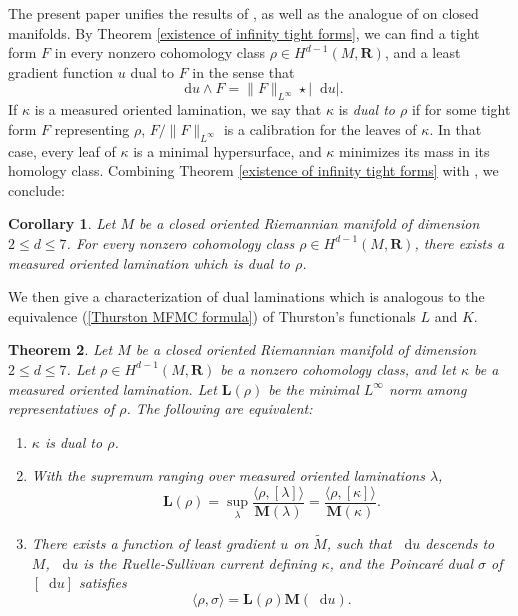 \documentclass[reqno,11pt]{amsart}
\newcommand{\RR}{\mathbf{R}}
\newcommand*\dif{\mathop{}\!\mathrm{d}}
\newcommand{\Mass}{\mathbf M}
\newcommand{\Comass}{\mathbf L}
\newcommand{\dfn}[1]{\emph{#1}\index{#1}}
\newtheorem{theorem}{Theorem}[section]
\newtheorem{corollary}[theorem]{Corollary}
\theoremstyle{definition}
\numberwithin{equation}{section}
\begin{document}
The present paper unifies the results of \cite{daskalopoulos2020transverse,bangert_cui_2017}, as well as the analogue of \cite{Mazon14} on closed manifolds.
By Theorem \ref{existence of infinity tight forms}, we can find a tight form $F$ in every nonzero cohomology class $\rho \in H^{d - 1}(M, \RR)$, and a least gradient function $u$ dual to $F$ in the sense that 
$$\dif u \wedge F = \|F\|_{L^\infty} \star |\dif u|.$$
If $\kappa$ is a measured oriented lamination, we say that $\kappa$ is \dfn{dual to $\rho$} if for some tight form $F$ representing $\rho$, $F/\|F\|_{L^\infty}$ is a calibration for the leaves of $\kappa$.
In that case, every leaf of $\kappa$ is a minimal hypersurface, and $\kappa$ minimizes its mass in its homology class.
Combining Theorem \ref{existence of infinity tight forms} with \cite[Theorem B]{BackusCML}, we conclude:

\begin{corollary}\label{existence of dual laminations}
Let $M$ be a closed oriented Riemannian manifold of dimension $2 \leq d \leq 7$.
For every nonzero cohomology class $\rho \in H^{d - 1}(M, \RR)$, there exists a measured oriented lamination which is dual to $\rho$.
\end{corollary}

We then give a characterization of dual laminations which is analogous to the equivalence (\ref{Thurston MFMC formula}) of Thurston's functionals $L$ and $K$.

\begin{theorem}\label{lams are calibrated}
Let $M$ be a closed oriented Riemannian manifold of dimension $2 \leq d \leq 7$.
Let $\rho \in H^{d - 1}(M, \RR)$ be a nonzero cohomology class, and let $\kappa$ be a measured oriented lamination.
Let $\Comass(\rho)$ be the minimal $L^\infty$ norm among representatives of $\rho$.
The following are equivalent:
\begin{enumerate}
\item $\kappa$ is dual to $\rho$.
\item With the supremum ranging over measured oriented laminations $\lambda$,
\begin{equation}\label{duality between stable and comass}
\Comass(\rho) = \sup_\lambda \frac{\langle \rho, [\lambda]\rangle}{\Mass(\lambda)} = \frac{\langle \rho, [\kappa]\rangle}{\Mass(\kappa)}.
\end{equation}
\item There exists a function of least gradient $u$ on $\tilde M$, such that $\dif u$ descends to $M$, $\dif u$ is the Ruelle-Sullivan current defining $\kappa$, and the Poincar\'e dual $\sigma$ of $[\dif u]$ satisfies
$$\langle \rho, \sigma\rangle = \Comass(\rho) \Mass(\dif u).$$
\end{enumerate}
\end{theorem}
\end{document}
